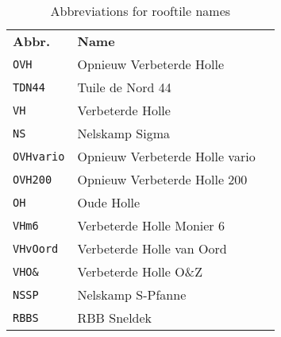 \begin{table}[H]
    \begin{tabular}{lll}
        \textbf{Abbr.}        & \textbf{Name} \\
        \verb|OVH|  & Opnieuw Verbeterde Holle \\
        \verb|TDN44|    & Tuile de Nord 44 \\
        \verb|VH|   & Verbeterde Holle  \\
        \verb|NS|   & Nelskamp Sigma \\
        \verb|OVHvario| & Opnieuw Verbeterde Holle vario \\
        \verb|OVH200|   & Opnieuw Verbeterde Holle 200 \\
        \verb|OH|   & Oude Holle \\
        \verb|VHm6| & Verbeterde Holle Monier 6 \\
        \verb|VHvOord|  & Verbeterde Holle van Oord \\
        \verb|VHO&|  &  Verbeterde Holle O\&Z \\
        \verb|NSSP| & Nelskamp S-Pfanne \\
        \verb|RBBS| & RBB Sneldek
    \end{tabular}
    \caption{Abbreviations for rooftile names}
    \label{tab:abbr_rooftile_names}
\end{table}
